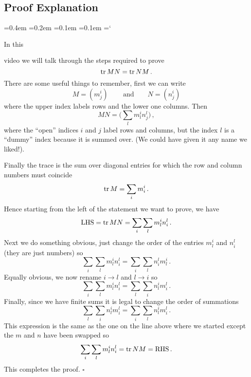 
\subsection*{Proof Explanation}

{\ttfamily
{}\font=0.4em
\font=0.2em
\font=0.1em
\font=0.1em
\hyphenchar\font=`\-


\hypertarget{scripts_properties_of_matrices_trace_proof}{In this} 
video we will talk through the steps required to prove
\[
\operatorname{tr} MN=\operatorname{tr} NM\, .
\]
There are some useful things to remember, first we can write
\[
M=(m^i_j)\, \qquad \mbox{and}\qquad N=(n^i_j)
\]
where the upper index labels rows and the lower one columns.
Then 
\[
MN=\big(\sum_l m^i_l n^l_j\big)\, ,
\]
where the ``open'' indices $i$ and $j$ label rows and columns, but the index $l$ is a ``dummy'' index because it is summed over. (We could have given it any name we liked!).

Finally the trace is the sum over diagonal entries for which the 
row and column numbers must coincide
\[
\operatorname{tr} M = \sum_i m^i_i\, .
\]
Hence starting from the left of the statement we want to prove, we have
\[
\mbox{LHS}= \operatorname{tr} MN = \sum_i \sum_l m^i_l n^l_i\, .
\]
Next we do something obvious, just change the order of the entries $m^i_l$ and $n^l_i$ (they are just numbers) so
\[
 \sum_i \sum_l m^i_l n^l_i= \sum_i \sum_l n^l_i m^i_l\, . 
\]
Equally obvious, we now rename $i\to l$ and $l\to i$ so
\[
 \sum_i \sum_l m^i_l n^l_i = \sum_l \sum_i n^i_l m^l_i\, . 
\]
Finally, since we have finite sums it is legal to change the order of summations
\[
 \sum_l \sum_i n^i_l m^l_i= \sum_i \sum_l n^i_l m^l_i\, . 
\]
This expression is the same as the one on the line above where we 
started except the $m$ and $n$ have been swapped so
\[
 \sum_i \sum_l m^i_l n^l_i= \operatorname{tr} NM =\mbox{RHS}\, . 
\]
This completes the proof. $\square$
} %

\newpage
